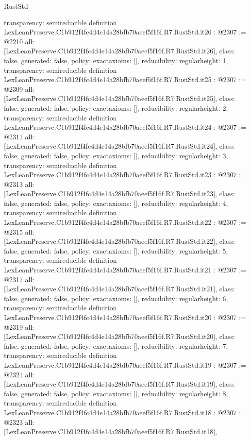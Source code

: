 \begin{lexlean}{RustStd}
\begin{coremodule}
{  transparency: semireducible
}
definition LexLeanPreserve.C1b912f4fc4d4e14a28bfb70aeef5f16f.R7.RustStd.it26 : @2307 := @2210 {
  all: [LexLeanPreserve.C1b912f4fc4d4e14a28bfb70aeef5f16f.R7.RustStd.it26],
  class: false,
  generated: false,
  policy: exact{axioms: []},
  reducibility: regular{height: 1},
  transparency: semireducible
}
definition LexLeanPreserve.C1b912f4fc4d4e14a28bfb70aeef5f16f.R7.RustStd.it25 : @2307 := @2309 {
  all: [LexLeanPreserve.C1b912f4fc4d4e14a28bfb70aeef5f16f.R7.RustStd.it25],
  class: false,
  generated: false,
  policy: exact{axioms: []},
  reducibility: regular{height: 2},
  transparency: semireducible
}
definition LexLeanPreserve.C1b912f4fc4d4e14a28bfb70aeef5f16f.R7.RustStd.it24 : @2307 := @2311 {
  all: [LexLeanPreserve.C1b912f4fc4d4e14a28bfb70aeef5f16f.R7.RustStd.it24],
  class: false,
  generated: false,
  policy: exact{axioms: []},
  reducibility: regular{height: 3},
  transparency: semireducible
}
definition LexLeanPreserve.C1b912f4fc4d4e14a28bfb70aeef5f16f.R7.RustStd.it23 : @2307 := @2313 {
  all: [LexLeanPreserve.C1b912f4fc4d4e14a28bfb70aeef5f16f.R7.RustStd.it23],
  class: false,
  generated: false,
  policy: exact{axioms: []},
  reducibility: regular{height: 4},
  transparency: semireducible
}
definition LexLeanPreserve.C1b912f4fc4d4e14a28bfb70aeef5f16f.R7.RustStd.it22 : @2307 := @2315 {
  all: [LexLeanPreserve.C1b912f4fc4d4e14a28bfb70aeef5f16f.R7.RustStd.it22],
  class: false,
  generated: false,
  policy: exact{axioms: []},
  reducibility: regular{height: 5},
  transparency: semireducible
}
definition LexLeanPreserve.C1b912f4fc4d4e14a28bfb70aeef5f16f.R7.RustStd.it21 : @2307 := @2317 {
  all: [LexLeanPreserve.C1b912f4fc4d4e14a28bfb70aeef5f16f.R7.RustStd.it21],
  class: false,
  generated: false,
  policy: exact{axioms: []},
  reducibility: regular{height: 6},
  transparency: semireducible
}
definition LexLeanPreserve.C1b912f4fc4d4e14a28bfb70aeef5f16f.R7.RustStd.it20 : @2307 := @2319 {
  all: [LexLeanPreserve.C1b912f4fc4d4e14a28bfb70aeef5f16f.R7.RustStd.it20],
  class: false,
  generated: false,
  policy: exact{axioms: []},
  reducibility: regular{height: 7},
  transparency: semireducible
}
definition LexLeanPreserve.C1b912f4fc4d4e14a28bfb70aeef5f16f.R7.RustStd.it19 : @2307 := @2321 {
  all: [LexLeanPreserve.C1b912f4fc4d4e14a28bfb70aeef5f16f.R7.RustStd.it19],
  class: false,
  generated: false,
  policy: exact{axioms: []},
  reducibility: regular{height: 8},
  transparency: semireducible
}
definition LexLeanPreserve.C1b912f4fc4d4e14a28bfb70aeef5f16f.R7.RustStd.it18 : @2307 := @2323 {
  all: [LexLeanPreserve.C1b912f4fc4d4e14a28bfb70aeef5f16f.R7.RustStd.it18],
}
\end{coremodule}
\end{lexlean}
